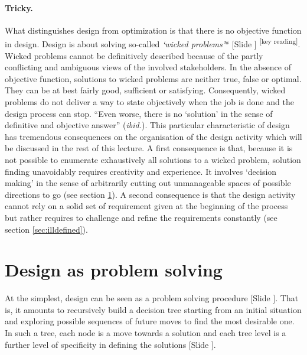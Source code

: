 \documentclass{article}
\newcounter{slide}
\begin{document}
\paragraph{Tricky.} What distinguishes design from optimization is that there is no objective function in design. Design is about solving so-called \emph{`wicked problems'}* {\color{blue}[Slide ]} \cite{rittelDilemmasGeneralTheory1973}\textsuperscript{\color{Magenta}[key reading]}. Wicked problems cannot be definitively described because of the partly conflicting and ambiguous views of the involved stakeholders. In the absence of objective function, solutions to wicked problems are neither true, false or optimal. They can be at best fairly good, sufficient or satisfying. Consequently, wicked problems do not deliver a way to state objectively when the job is done and the design process can stop. ``Even worse, there is no `solution' in the sense of definitive and objective answer'' (\emph{ibid.}). This particular characteristic of design has tremendous consequences on the organisation of the design activity which will be discussed in the rest of this lecture. A first consequence is that, because it is not possible to enumerate exhaustively all solutions to a wicked problem, solution finding unavoidably requires creativity and experience. It involves `decision making' in the sense of arbitrarily cutting out unmanageable spaces of possible directions to go (see section \ref{sec:GeneralProblemSolving}). A second consequence is that the design activity cannot rely on a solid set of requirement given at the beginning of the process but rather requires to challenge and refine the requirements constantly (see section \ref{sec:illdefined}). 

\section{Design as problem solving}
\label{sec:GeneralProblemSolving}
At the simplest, design can be seen as a problem solving procedure {\color{blue}[Slide ]}. That is, it amounts to recursively build a decision tree starting from an initial situation and exploring possible sequences of future moves to find the most desirable one. In such a tree, each node is a move towards a solution and each tree level is a further level of specificity in defining the solutions {\color{blue}[Slide ]}. 
\end{document}
